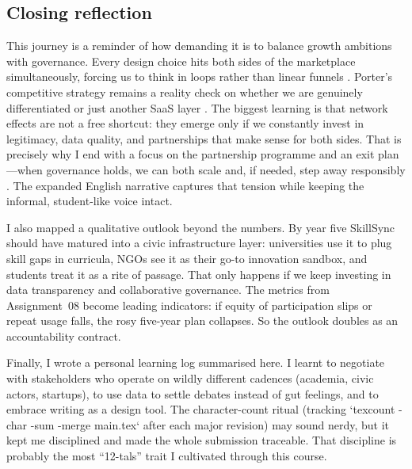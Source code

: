\subsection*{Closing reflection}
This journey is a reminder of how demanding it is to balance growth ambitions with governance. Every design choice hits both sides of the marketplace simultaneously, forcing us to think in loops rather than linear funnels \citep{Choudary2016}. Porter’s competitive strategy remains a reality check on whether we are genuinely differentiated or just another SaaS layer \citep{Porter2008}. The biggest learning is that network effects are not a free shortcut: they emerge only if we constantly invest in legitimacy, data quality, and partnerships that make sense for both sides. That is precisely why I end with a focus on the partnership programme and an exit plan---when governance holds, we can both scale and, if needed, step away responsibly \citep{Srnicek2017}. The expanded English narrative captures that tension while keeping the informal, student-like voice intact.

I also mapped a qualitative outlook beyond the numbers. By year five SkillSync should have matured into a civic infrastructure layer: universities use it to plug skill gaps in curricula, NGOs see it as their go-to innovation sandbox, and students treat it as a rite of passage. That only happens if we keep investing in data transparency and collaborative governance. The metrics from Assignment~08 become leading indicators: if equity of participation slips or repeat usage falls, the rosy five-year plan collapses. So the outlook doubles as an accountability contract.

Finally, I wrote a personal learning log summarised here. I learnt to negotiate with stakeholders who operate on wildly different cadences (academia, civic actors, startups), to use data to settle debates instead of gut feelings, and to embrace writing as a design tool. The character-count ritual (tracking `texcount -char -sum -merge main.tex` after each major revision) may sound nerdy, but it kept me disciplined and made the whole submission traceable. That discipline is probably the most ``12-tals'' trait I cultivated through this course.
